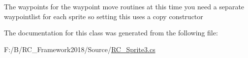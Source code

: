 The waypoints for the waypoint move routines at this time you need a separate waypointlist for each sprite so setting this uses a copy constructor 



The documentation for this class was generated from the following file\+:\begin{DoxyCompactItemize}
\item 
F\+:/\+B/\+R\+C\+\_\+\+Framework2018/\+Source/\mbox{\hyperlink{_r_c___sprite3_8cs}{R\+C\+\_\+\+Sprite3.\+cs}}\end{DoxyCompactItemize}

